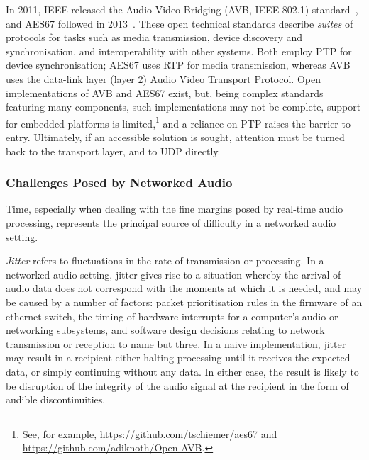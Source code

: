 \documentclass[utf8]{FrontiersinHarvard}
\begin{document}
    In 2011, IEEE released the Audio Video Bridging (AVB, IEEE 802.1)
    standard~\citep{ieee_ieee_2011}, and AES67 followed in
    2013~\citep{hildebrand_aes67-2013_2014}.
    These open technical standards describe \textit{suites} of protocols for
    tasks such as media transmission, device discovery and
    synchronisation, and interoperability with other systems.
    Both employ PTP for device synchronisation; AES67 uses RTP for media
    transmission, whereas AVB uses the data-link layer (layer 2) Audio Video
    Transport Protocol.
    Open implementations of AVB and AES67 exist, but, being complex standards
    featuring many components, such implementations may not be complete, support
    for embedded platforms is limited,\footnote{
        See, for example, \url{https://github.com/tschiemer/aes67} and
        \url{https://github.com/adiknoth/Open-AVB}.
    } and a reliance on
    PTP raises the barrier to entry.
    Ultimately, if an accessible solution is sought, attention must be turned
    back to the transport layer, and to UDP directly.

    \subsubsection{Challenges Posed by Networked Audio}\label{subsubsec:challenges}

    Time, especially when dealing with the fine margins posed by real-time audio
    processing, represents the principal source of difficulty in a networked
    audio setting.

    \textit{Jitter} refers to fluctuations in the rate of transmission or
    processing.
    In a networked audio setting, jitter gives rise to a situation whereby the
    arrival of audio data does not correspond with the moments at which it is
    needed, and may be caused by a number of factors: packet prioritisation
    rules in the firmware of an ethernet switch, the timing of hardware
    interrupts for a computer's audio or networking subsystems, and software
    design decisions relating to network transmission or reception to name but
    three.
    In a naive implementation, jitter may result in a recipient either halting
    processing until it receives the expected data, or simply continuing without
    any data.
    In either case, the result is likely to be disruption of the integrity of
    the audio signal at the recipient in the form of audible discontinuities.
\end{document}
